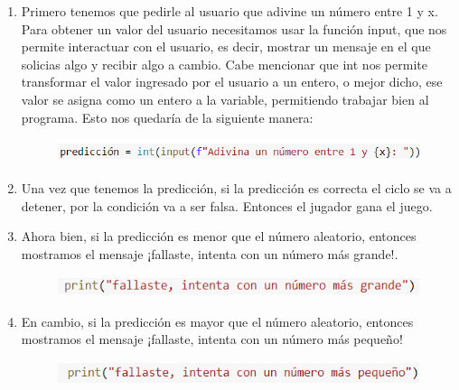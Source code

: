 \documentclass[a4paper,12pt]{article}
\begin{document}
\begin{enumerate}
    
    \item \large{Primero tenemos que pedirle al usuario que adivine un número entre 1 y x. Para obtener un valor del usuario necesitamos usar la función input, que nos permite interactuar con el usuario, es decir, mostrar un mensaje en el que solicias algo y recibir algo a cambio. Cabe mencionar   que int nos permite transformar el valor ingresado por el usuario a un entero, o mejor dicho, ese valor se asigna como un entero a la variable, permitiendo trabajar bien al programa. Esto nos quedaría de la siguiente manera:}
    
    \begin{figure}[H]
    \caption{}
    \centering \includegraphics[width=11cm, height=0.7cm]{int.png}
    \label{fig1:my_label}
    \end{figure}
    
    \item \large{Una vez que tenemos la predicción, si la predicción es correcta el ciclo se va a detener, por la condición va a ser falsa. Entonces el jugador gana el juego.}

    
    \item \large{Ahora bien, si la predicción es menor que el número aleatorio, entonces mostramos el mensaje ¡fallaste, intenta con un número más grande!.}

    \begin{figure}[H]
    \caption{}
    \centering \includegraphics[width=11cm, height=0.6cm]{print1.png}
    \label{fig1:my_label}
    \end{figure}    
    
    \item \large{En cambio, si la predicción es mayor que el número aleatorio, entonces mostramos el mensaje ¡fallaste, intenta con un número más pequeño!}

    \begin{figure}[H]
    \caption{}
    \centering \includegraphics[width=11cm, height=0.7cm]{print2.png}
    \label{fig1:my_label}
    \end{figure}  
    

\end{enumerate}
\end{document}
